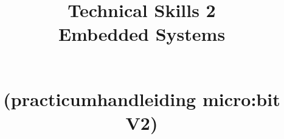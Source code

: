 \documentclass[12pt,openright,twoside]{report}
\date{}
\title{

{\vspace{-4cm}}
	{\hspace{-20pt}\begin{bfseries}\Huge{\color{black}Technical Skills 2 \\Embedded Systems} \end{bfseries}  } \\
	{(practicumhandleiding micro:bit V2)}
\ThisCenterWallPaper{0.8}{figuren/bbcmicrobitV2.png}

	{\vspace{12cm}}	
	{\color{white}  
	\raggedleft  \par}

}
\begin{document}
\maketitle


 \tableofcontents

\let\cleardoublepage\clearpage





%

%






\end{document}
